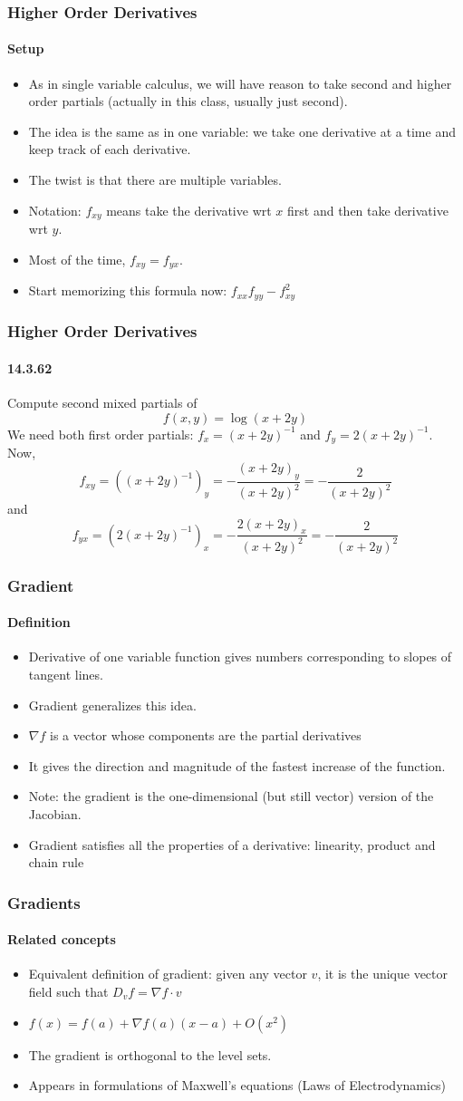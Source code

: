 \documentclass[xcolor=svgnames]{beamer}
\begin{document}
\begin{frame}
\frametitle{Higher Order Derivatives}
\framesubtitle{Setup}
\begin{itemize}
\item As in single variable calculus, we will have reason to take second and higher order partials (actually in this class, usually just second).
\item The idea is the same as in one variable: we take one derivative at a time and keep track of each derivative. 
\item The twist is that there are multiple variables.
\item Notation: $f_{xy}$ means take the derivative wrt $x$ first and then take derivative wrt $y$. 
\item Most of the time, $f_{xy} = f_{yx}$. 
\item Start memorizing this formula now: $f_{xx} f_{yy} - f_{xy}^2$
\end{itemize}
\end{frame}
\begin{frame}
\frametitle{Higher Order Derivatives}
\framesubtitle{14.3.62}
Compute second mixed partials of 
\[
	f(x,y) = \log (x + 2y)
\]
We need both first order partials: $f_x = (x+2y)^{-1}$ and $f_y = 2(x+2y)^{-1}$. Now,
\[
	f_{xy} = \left((x+2y)^{-1}\right)_y = -\frac{(x+2y)_y}{(x+2y)^2} = - \frac{2}{(x+2y)^2}
\]
and
\[
	f_{yx} =\left( 2(x+2y)^{-1} \right) _x =  -\frac{2(x+2y)_x}{(x+2y)^2} = - \frac{2}{(x+2y)^2}
\]
\end{frame}
\begin{frame}
\frametitle{Gradient}
\framesubtitle{Definition}
\begin{itemize}
\item Derivative of one variable function gives numbers corresponding to slopes of tangent lines.
\item Gradient generalizes this idea.
\item $\nabla f$ is a vector whose components are the partial derivatives
\item It gives the direction and magnitude of the fastest increase of the function.
\item Note: the gradient is the one-dimensional (but still vector) version of the Jacobian. 
\item Gradient satisfies all the properties of a derivative: linearity, product and chain rule
\end{itemize}
\end{frame}
\begin{frame}
\frametitle{Gradients}
\framesubtitle{Related concepts}
\begin{itemize}
\item Equivalent definition of gradient: given any vector $v$, it is the unique vector field such that $D_v f = \nabla f \cdot v$
\item $f(x) = f(a) + \nabla f (a) (x - a) + O(x^2)$
\item The gradient is orthogonal to the level sets. 
\item Appears in formulations of Maxwell's equations (Laws of Electrodynamics)
\end{itemize}
\end{frame}
\end{document}
